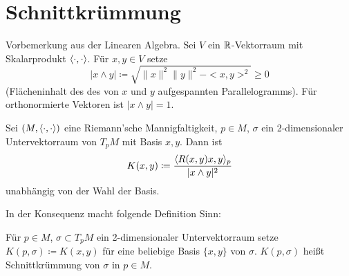 \documentclass[a4paper,twoside,DIV15,BCOR12mm]{scrbook}
\renewcommand{\da}{\coloneqq}
\begin{document}
\section{Schnittkrümmung}

Vorbemerkung aus der Linearen Algebra. Sei $V$ ein $\mathbb{R}$-Vektorraum mit Skalarprodukt $\langle\cdot,\cdot\rangle$. Für $x,y\in V$ setze 
\[
| x \wedge y| \da \sqrt{\|x\|^2 \|y\|^2 - <x,y>^2} \ge 0
\]
(Flächeninhalt des des von $x$ und $y$ aufgespannten Parallelogramms). Für orthonormierte Vektoren ist $|x\wedge y| = 1$.

\begin{lemma}
Sei $(M,\langle\cdot,\cdot\rangle)$ eine Riemann’sche Mannigfaltigkeit, $p\in M$, $\sigma$ ein 2-dimensionaler Untervektorraum von $T_pM$ mit Basis $x,y$. Dann ist 
\[
K(x,y) \da \frac{\ksp {R(x,y)x} y_p}{|x\wedge y|^2}
\] unabhängig von der Wahl der Basis.
\end{lemma}

In der Konsequenz macht folgende Definition Sinn:
\begin{definition}
Für $p\in M$, $\sigma \subset T_pM$ ein 2-dimensionaler Untervektorraum setze $K(p,\sigma) \da K(x,y)$ für eine beliebige Basis $\{x,y\}$ von $\sigma$. $K(p,\sigma)$ heißt Schnittkrümmung von $\sigma$ in $p\in M$.
\end{definition}
\end{document}
